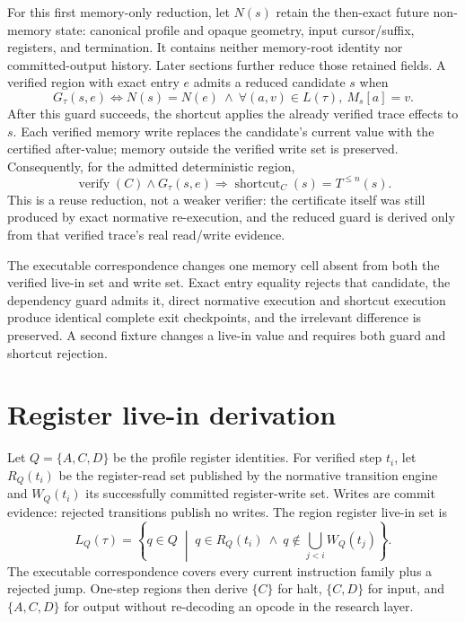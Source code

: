 \documentclass{article}
\begin{document}
For this first memory-only reduction, let $N(s)$ retain the then-exact future
non-memory state: canonical profile and opaque geometry, input cursor/suffix,
registers, and termination. It contains neither memory-root identity nor
committed-output history. Later sections further reduce those retained fields.
A verified region with exact entry $e$ admits a reduced candidate $s$ when
\begin{equation}
  G_{\tau}(s,e)
  \Longleftrightarrow
  N(s)=N(e)\ \land\
  \forall(a,v)\in L(\tau),\ M_s[a]=v.
  \label{eq:state-graph-region-dependency-guard}
\end{equation}
After this guard succeeds, the shortcut applies the already verified trace
effects
to $s$. Each verified memory write replaces the candidate's current value with
the certified after-value; memory outside the verified write set is preserved.
Consequently, for the admitted deterministic region,
\[
  \operatorname{verify}(C)\land G_{\tau}(s,e)
  \Longrightarrow
  \operatorname{shortcut}_C(s)=T^{\leq n}(s).
\]
This is a reuse reduction, not a weaker verifier: the certificate itself was
still produced by exact normative re-execution, and the reduced guard is derived
only from that verified trace's real read/write evidence.

The executable correspondence changes one memory cell absent from both the
verified live-in set and write set. Exact entry equality rejects that candidate,
the dependency guard admits it, direct normative execution and shortcut
execution
produce identical complete exit checkpoints, and the irrelevant difference is
preserved. A second fixture changes a live-in value and requires both guard and
shortcut rejection.

\section{Register live-in derivation}

Let $Q=\{A,C,D\}$ be the profile register identities. For verified step $t_i$,
let $R_Q(t_i)$ be the register-read set published by the normative transition
engine and $W_Q(t_i)$ its successfully committed register-write set. Writes are
commit evidence: rejected transitions publish no writes. The region register
live-in set is
\begin{equation}
  L_Q(\tau)=\left\{q\in Q\;\middle|\;
    q\in R_Q(t_i)\ \land\
    q\notin\bigcup_{j<i}W_Q(t_j)
  \right\}.
  \label{eq:state-graph-region-register-live-in}
\end{equation}
The executable correspondence covers every current instruction family plus a
rejected jump. One-step regions then derive $\{C\}$ for halt, $\{C,D\}$ for
input, and $\{A,C,D\}$ for output without re-decoding an opcode in the research
layer.
\end{document}
